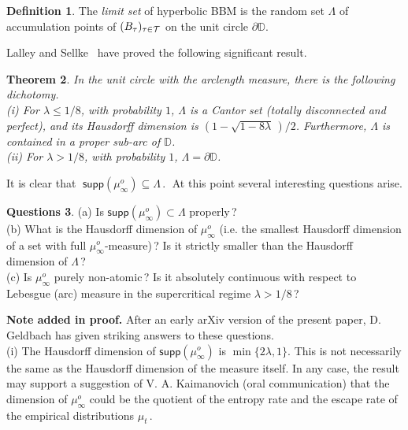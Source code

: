 \documentclass[12pt]{amsart}
\newcommand\BB{\textit{\textbf{B}}}
\newcommand\DD{\mathbb D}
\newcommand\Ls{\Lambda}
\newcommand\T{\mathcal T}
\newtheorem{theorem}{Theorem}%
\numberwithin{theorem}{section}
\theoremstyle{definition}
\newtheorem{dfn}[theorem]{Definition}%
\newtheorem{ques}[theorem]{Questions}%
\begin{document}
\begin{dfn}\label{def:limset}
The \emph{limit set} of hyperbolic BBM is the random set $\Ls$ of accumulation points 
of $(\BB_{\tau})_{\tau \in \T}$ on the unit circle $\partial \DD$.
\end{dfn}

{\sc Lalley and Sellke}~\cite{LS} have proved the following significant result.

\begin{theorem} \cite{LS} \label{thm:LS}
In the unit circle with the arclength measure, there is the following dichotomy.
\\[3pt]
\emph{(i)} For $\lambda \le 1/8$, with probability $1$, $\Ls$ is a 
Cantor set (totally disconnected and
perfect), and its Hausdorff dimension is $(1-\sqrt{1-8\lambda}\,)/2$.
Furthermore, $\Ls$ is contained in a proper sub-arc of $\DD$.
\\[3pt]
\emph{(ii)} For $\lambda > 1/8$, with probability $1$, $\Ls = \partial \DD$.
\end{theorem}

It is clear that
$\;
\mathsf{supp}(\mu_{\infty}^o) \subseteq \Ls\,.
\;$
At this point several interesting questions arise.

\begin{ques}\label{ques:tions} (a) Is $\mathsf{supp}(\mu_{\infty}^o) \subset \Ls$ 
properly$\,$?
\\[3pt]
(b) What is the Hausdorff dimension of $\mu_{\infty}^o$ (i.e. the smallest Hausdorff 
dimension of a set with full $\mu_{\infty}^o$-measure)$\,$? Is it strictly smaller than the 
Hausdorff dimension of $\Ls\,$?
\\[3pt]
(c) Is $\mu_{\infty}^o$ purely non-atomic$\,$? Is it absolutely continuous with respect to
Lebesgue (arc) measure in the supercritical regime $\lambda > 1/8\,$?
\end{ques}

\noindent
\textbf{Note added in proof.} After an early arXiv version of the present paper,
D. Geldbach \cite{Ge} has given striking answers to these questions.
\\[3pt]
(i) The Hausdorff dimension of $\mathsf{supp}(\mu_{\infty}^o)$ is $\min \{2\lambda, 1 \}$. 
This is not necessarily the same as the Hausdorff dimension of the measure itself.
In any case, the result may support a 
suggestion of V. A. Kaimanovich (oral communication) that the dimension of 
$\mu_{\infty}^o$ could be the quotient of the entropy rate and the escape rate of 
the empirical distributions $\mu_t\,$.  
\end{document}
